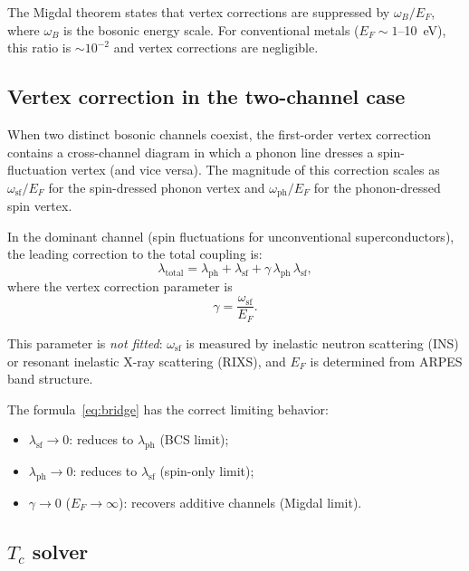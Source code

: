 \documentclass[twocolumn,showpacs,preprintnumbers,amsmath,amssymb,prb]{revtex4-2}
\begin{document}
The Migdal theorem states that vertex corrections are suppressed by $\omega_B / E_F$, where $\omega_B$ is the bosonic energy scale.
For conventional metals ($E_F \sim 1$--10~eV), this ratio is $\sim 10^{-2}$ and vertex corrections are negligible.

\subsection{Vertex correction in the two-channel case}

When two distinct bosonic channels coexist, the first-order vertex correction contains a cross-channel diagram in which a phonon line dresses a spin-fluctuation vertex (and vice versa).
The magnitude of this correction scales as $\omega_{\mathrm{sf}} / E_F$ for the spin-dressed phonon vertex and $\omega_{\mathrm{ph}} / E_F$ for the phonon-dressed spin vertex.

In the dominant channel (spin fluctuations for unconventional superconductors), the leading correction to the total coupling is:
\begin{equation}
\lambda_{\mathrm{total}} = \lambda_{\mathrm{ph}} + \lambda_{\mathrm{sf}} + \gamma \, \lambda_{\mathrm{ph}} \, \lambda_{\mathrm{sf}},
\label{eq:bridge}
\end{equation}
where the vertex correction parameter is
\begin{equation}
\gamma = \frac{\omega_{\mathrm{sf}}}{E_F}.
\label{eq:gamma}
\end{equation}

This parameter is \textit{not fitted}: $\omega_{\mathrm{sf}}$ is measured by inelastic neutron scattering (INS) or resonant inelastic X-ray scattering (RIXS), and $E_F$ is determined from ARPES band structure.

The formula~\eqref{eq:bridge} has the correct limiting behavior:
\begin{itemize}
\item $\lambda_{\mathrm{sf}} \to 0$: reduces to $\lambda_{\mathrm{ph}}$ (BCS limit);
\item $\lambda_{\mathrm{ph}} \to 0$: reduces to $\lambda_{\mathrm{sf}}$ (spin-only limit);
\item $\gamma \to 0$ ($E_F \to \infty$): recovers additive channels (Migdal limit).
\end{itemize}

\subsection{$T_c$ solver}
\end{document}
